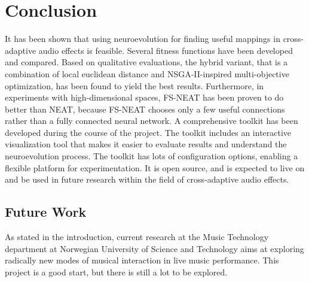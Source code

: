 \chapter{Conclusion}
\label{chapter:conclusion}

It has been shown that using neuroevolution for finding useful mappings in cross-adaptive audio effects is feasible. Several fitness functions have been developed and compared. Based on qualitative evaluations, the hybrid variant, that is a combination of local euclidean distance and NSGA-II-inspired multi-objective optimization, has been found to yield the best results. Furthermore, in experiments with high-dimensional spaces, FS-NEAT has been proven to do better than NEAT, because FS-NEAT chooses only a few useful connections rather than a fully connected neural network. A comprehensive toolkit has been developed during the course of the project. The toolkit includes an interactive visualization tool that makes it easier to evaluate results and understand the neuroevolution process. The toolkit has lots of configuration options, enabling a flexible platform for experimentation. It is open source, and is expected to live on and be used in future research within the field of cross-adaptive audio effects.

\section{Future Work}

As stated in the introduction, current research at the Music Technology department at Norwegian University of Science and Technology aims at exploring radically new modes of musical interaction in live music performance. This project is a good start, but there is still a lot to be explored.


